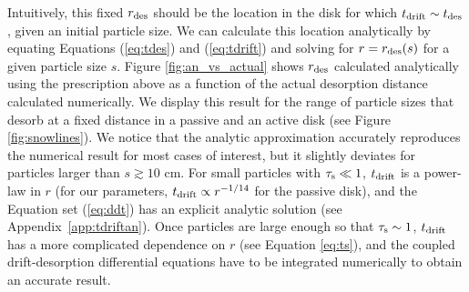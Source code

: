 \documentclass[apj]{emulateapj}
\newcommand{\App}[1]{Appendix~\ref{#1}}
\newcommand{\emgr}[1]{\emph{ \color{gray} #1}}
\begin{document}
Intuitively, this fixed $r_{\rm des}$ should be the location in the disk for which $t_{\rm drift} \sim t_{\rm des}$, given an initial particle size. We can calculate this location analytically by equating Equations (\ref{eq:tdes}) and (\ref{eq:tdrift}) and solving for $r=r_{\rm des}(s)$ for a given particle size $s$. Figure \ref{fig:an_vs_actual} shows $r_{\rm des}$ calculated analytically using the prescription above as a function of the actual desorption distance calculated numerically. We display this result for the range of particle sizes that desorb at a fixed distance in a passive and an active disk (see Figure \ref{fig:snowlines}). We notice that the analytic approximation accurately reproduces the numerical result for most cases of interest, but it slightly deviates for particles larger than $s \gtrsim10$ cm. For small particles with $\tau_{\rm s} \ll 1$, $t_{\rm drift}$ is a power-law in $r$ (for our parameters, $t_{\rm drift} \propto r^{-1/14}$ for the passive disk), and the Equation set (\ref{eq:ddt}) has an explicit analytic solution (see \App{app:tdriftan}). Once particles are large enough so that $\tau_{\rm s} \sim 1$, $t_{\rm drift}$ has a more complicated dependence on $r$ (see Equation \ref{eq:ts}), and the coupled drift-desorption differential equations have to be integrated numerically to obtain an accurate result. 





\end{document}
